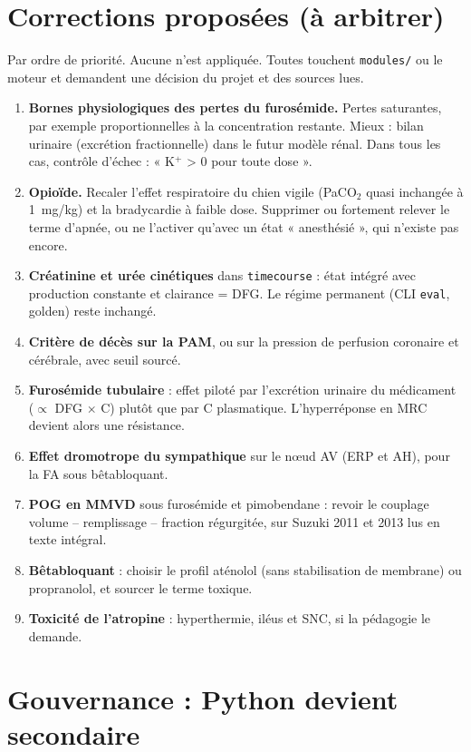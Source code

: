 \documentclass[10pt,a4paper]{article}
\newcommand{\cmd}[1]{\texttt{#1}}
\begin{document}
\section{Corrections proposées (à arbitrer)}\label{sec:corrections}

Par ordre de priorité. Aucune n'est appliquée. Toutes touchent \cmd{modules/} ou le moteur et demandent une décision du projet et des sources lues.

\begin{enumerate}
\item \textbf{Bornes physiologiques des pertes du furosémide.} Pertes saturantes, par exemple proportionnelles à la concentration restante. Mieux : bilan urinaire (excrétion fractionnelle) dans le futur modèle rénal. Dans tous les cas, contrôle d'échec : « K$^+$ > 0 pour toute dose ».
\item \textbf{Opioïde.} Recaler l'effet respiratoire du chien vigile (PaCO$_2$ quasi inchangée à 1~mg/kg) et la bradycardie à faible dose. Supprimer ou fortement relever le terme d'apnée, ou ne l'activer qu'avec un état « anesthésié », qui n'existe pas encore.
\item \textbf{Créatinine et urée cinétiques} dans \cmd{timecourse} : état intégré avec production constante et clairance = DFG. Le régime permanent (CLI \cmd{eval}, golden) reste inchangé.
\item \textbf{Critère de décès sur la PAM}, ou sur la pression de perfusion coronaire et cérébrale, avec seuil sourcé.
\item \textbf{Furosémide tubulaire} : effet piloté par l'excrétion urinaire du médicament ($\propto$ DFG $\times$ C) plutôt que par C plasmatique. L'hyperréponse en MRC devient alors une résistance.
\item \textbf{Effet dromotrope du sympathique} sur le nœud AV (ERP et AH), pour la FA sous bêtabloquant.
\item \textbf{POG en MMVD} sous furosémide et pimobendane : revoir le couplage volume -- remplissage -- fraction régurgitée, sur Suzuki 2011 et 2013 lus en texte intégral.
\item \textbf{Bêtabloquant} : choisir le profil aténolol (sans stabilisation de membrane) ou propranolol, et sourcer le terme toxique.
\item \textbf{Toxicité de l'atropine} : hyperthermie, iléus et SNC, si la pédagogie le demande.
\end{enumerate}

\section{Gouvernance : Python devient secondaire}\label{sec:gouvernance}
\end{document}
